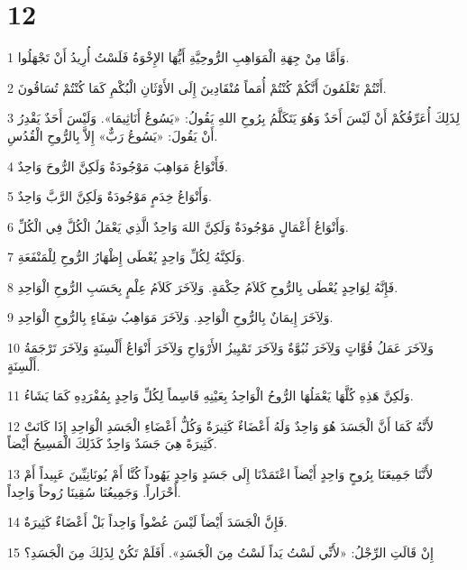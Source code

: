 \chapter{12}

\par 1 وَأَمَّا مِنْ جِهَةِ الْمَوَاهِبِ الرُّوحِيَّةِ أَيُّهَا الإِخْوَةُ فَلَسْتُ أُرِيدُ أَنْ تَجْهَلُوا.
\par 2 أَنْتُمْ تَعْلَمُونَ أَنَّكُمْ كُنْتُمْ أُمَماً مُنْقَادِينَ إِلَى الأَوْثَانِ الْبُكْمِ كَمَا كُنْتُمْ تُسَاقُونَ.
\par 3 لِذَلِكَ أُعَرِّفُكُمْ أَنْ لَيْسَ أَحَدٌ وَهُوَ يَتَكَلَّمُ بِرُوحِ اللهِ يَقُولُ: «يَسُوعُ أَنَاثِيمَا». وَلَيْسَ أَحَدٌ يَقْدِرُ أَنْ يَقُولَ: «يَسُوعُ رَبٌّ» إِلاَّ بِالرُّوحِ الْقُدُسِ.
\par 4 فَأَنْوَاعُ مَوَاهِبَ مَوْجُودَةٌ وَلَكِنَّ الرُّوحَ وَاحِدٌ.
\par 5 وَأَنْوَاعُ خِدَمٍ مَوْجُودَةٌ وَلَكِنَّ الرَّبَّ وَاحِدٌ.
\par 6 وَأَنْوَاعُ أَعْمَالٍ مَوْجُودَةٌ وَلَكِنَّ اللهَ وَاحِدٌ الَّذِي يَعْمَلُ الْكُلَّ فِي الْكُلِّ.
\par 7 وَلَكِنَّهُ لِكُلِّ وَاحِدٍ يُعْطَى إِظْهَارُ الرُّوحِ لِلْمَنْفَعَةِ.
\par 8 فَإِنَّهُ لِوَاحِدٍ يُعْطَى بِالرُّوحِ كَلاَمُ حِكْمَةٍ. وَلِآخَرَ كَلاَمُ عِلْمٍ بِحَسَبِ الرُّوحِ الْوَاحِدِ.
\par 9 وَلِآخَرَ إِيمَانٌ بِالرُّوحِ الْوَاحِدِ. وَلِآخَرَ مَوَاهِبُ شِفَاءٍ بِالرُّوحِ الْوَاحِدِ.
\par 10 وَلِآخَرَ عَمَلُ قُوَّاتٍ وَلِآخَرَ نُبُوَّةٌ وَلِآخَرَ تَمْيِيزُ الأَرْوَاحِ وَلِآخَرَ أَنْوَاعُ أَلْسِنَةٍ وَلِآخَرَ تَرْجَمَةُ أَلْسِنَةٍ.
\par 11 وَلَكِنَّ هَذِهِ كُلَّهَا يَعْمَلُهَا الرُّوحُ الْوَاحِدُ بِعَيْنِهِ قَاسِماً لِكُلِّ وَاحِدٍ بِمُفْرَدِهِ كَمَا يَشَاءُ.
\par 12 لأَنَّهُ كَمَا أَنَّ الْجَسَدَ هُوَ وَاحِدٌ وَلَهُ أَعْضَاءٌ كَثِيرَةٌ وَكُلُّ أَعْضَاءِ الْجَسَدِ الْوَاحِدِ إِذَا كَانَتْ كَثِيرَةً هِيَ جَسَدٌ وَاحِدٌ كَذَلِكَ الْمَسِيحُ أَيْضاً.
\par 13 لأَنَّنَا جَمِيعَنَا بِرُوحٍ وَاحِدٍ أَيْضاً اعْتَمَدْنَا إِلَى جَسَدٍ وَاحِدٍ يَهُوداً كُنَّا أَمْ يُونَانِيِّينَ عَبِيداً أَمْ أَحْرَاراً. وَجَمِيعُنَا سُقِينَا رُوحاً وَاحِداً.
\par 14 فَإِنَّ الْجَسَدَ أَيْضاً لَيْسَ عُضْواً وَاحِداً بَلْ أَعْضَاءٌ كَثِيرَةٌ.
\par 15 إِنْ قَالَتِ الرِّجْلُ: «لأَنِّي لَسْتُ يَداً لَسْتُ مِنَ الْجَسَدِ». أَفَلَمْ تَكُنْ لِذَلِكَ مِنَ الْجَسَدِ؟
